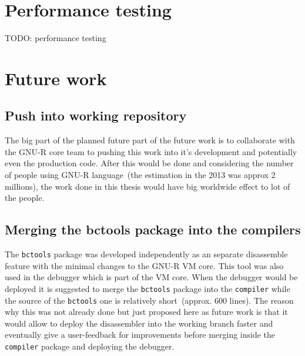 \documentclass[thesis=M,english]{FITthesis}[2018/10/20]
\newcommand{\code}[1]{\texttt{#1}}
\begin{document}
{%


\section{Performance testing}

TODO: performance testing

\section{Future work}

\subsection{Push into working repository}

The big part of the planned future part of the future work is to collaborate with the GNU-R core team to pushing this work into it's development and potentially even the production code. After this would be done and considering the number of people using GNU-R language~(the estimation in the 2013 was approx 2 millions), the work done in this thesis would have big worldwide effect to lot of the people.

\subsection{Merging the bctools package into the compilers}

The \code{bctools} package was developed independently as an separate disassemble feature with the minimal changes to the GNU-R VM core. This tool was also used in the debugger which is part of the VM core. When the debugger would be deployed it is suggested to merge the \code{bctools} package into the \code{compiler} while the source of the \code{bctools} one is relatively short~(approx. 600 lines). The reason why this was not already done but just proposed here as future work is that it would allow to deploy the disassembler into the working branch faster and eventually give a user-feedback for improvements before merging inside the \code{compiler} package and deploying the debugger.

}
\end{document}
